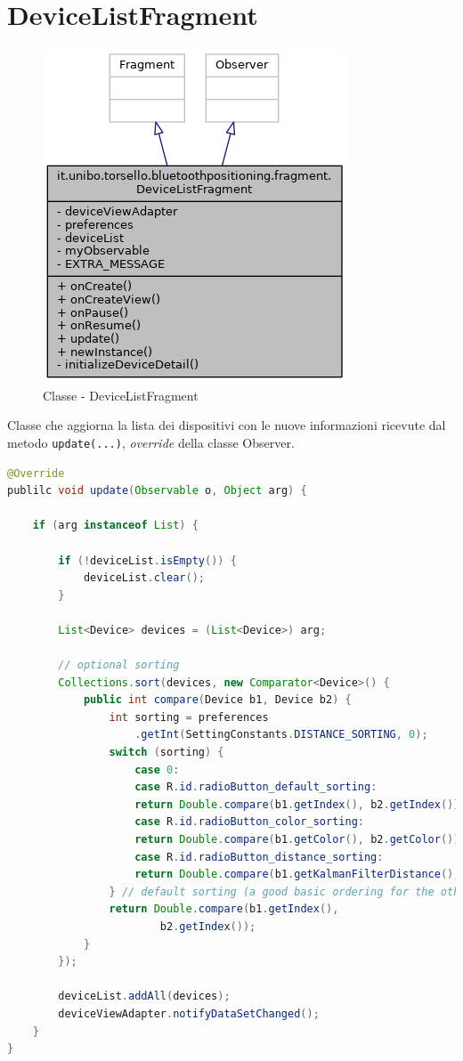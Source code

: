 \newpage
\section{DeviceListFragment}\label{ch:device_list}
\begin{figure}[ph]
	\centering
	\includegraphics[width=0.5\linewidth]{img/uml/class/classit_1_1unibo_1_1torsello_1_1bluetoothpositioning_1_1fragment_1_1DeviceListFragment__inherit__graph.png}
	\caption{Classe - DeviceListFragment}
\end{figure}

Classe che aggiorna la lista dei dispositivi con le nuove informazioni ricevute dal metodo \texttt{update(...)}, \textit{override} della classe Observer.
\begin{lstlisting}[language=Java]
@Override
publilc void update(Observable o, Object arg) {
	
	if (arg instanceof List) {
		
		if (!deviceList.isEmpty()) {
			deviceList.clear();
		}
		
		List<Device> devices = (List<Device>) arg;
		
		// optional sorting
		Collections.sort(devices, new Comparator<Device>() {
			public int compare(Device b1, Device b2) {
				int sorting = preferences
					.getInt(SettingConstants.DISTANCE_SORTING, 0);
				switch (sorting) {
					case 0:
					case R.id.radioButton_default_sorting:
					return Double.compare(b1.getIndex(), b2.getIndex());
					case R.id.radioButton_color_sorting:
					return Double.compare(b1.getColor(), b2.getColor());
					case R.id.radioButton_distance_sorting:
					return Double.compare(b1.getKalmanFilterDistance(), b2.getKalmanFilterDistance());
				} // default sorting (a good basic ordering for the other options)
				return Double.compare(b1.getIndex(), 
						b2.getIndex());
			}
		});
		
		deviceList.addAll(devices);
		deviceViewAdapter.notifyDataSetChanged();
	}
}
\end{lstlisting}

